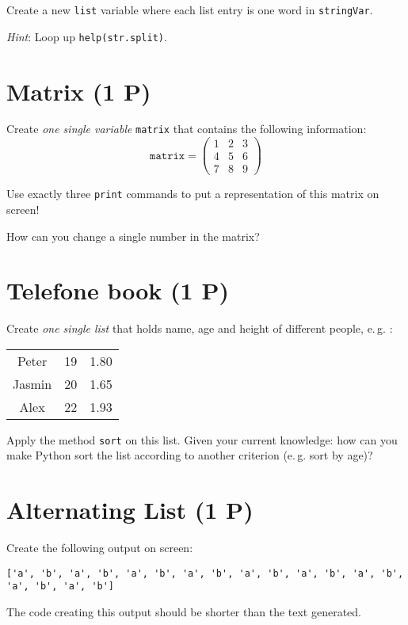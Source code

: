 \documentclass[
	ngerman,
	fontsize=10pt,
	parskip=half,
	titlepage=true,
	DIV=12
]{scrartcl}
\newcommand*{\inPy}[1]{\texttt{#1}}
\newcommand*{\eg}{e.\,g. }
\begin{document}
Create a new \inPy{list} variable where each list entry is one word in \texttt{stringVar}.

\emph{Hint}: Loop up \texttt{help(str.split)}.


\section{Matrix (1 P)}
Create \emph{one single variable} \inPy{matrix} that contains the following information:
\begin{equation*}
	\texttt{matrix} = \begin{pmatrix}
		1 & 2 & 3 \\
		4 & 5 & 6 \\
		7 & 8 & 9
	\end{pmatrix}
\end{equation*}

Use exactly three \inPy{print} commands to put a representation of this matrix on screen!

How can you change a single number in the matrix?

\section{Telefone book (1 P)}
Create \emph{one single list} that holds name, age and height of different people, \eg :
\begin{center}
	\begin{tabular}{ccc}
	Peter  & 19 & 1.80 \\
	Jasmin & 20 & 1.65 \\
	Alex   & 22 & 1.93
	\end{tabular}
\end{center}

Apply the method \inPy{sort} on this list. Given your current knowledge: how can you make Python sort the list according to another criterion (\eg sort by age)?

\section{Alternating List (1 P)}
Create the following output on screen:

\begin{verbatim}
['a', 'b', 'a', 'b', 'a', 'b', 'a', 'b', 'a', 'b', 'a', 'b', 'a', 'b', 'a', 'b', 'a', 'b']
\end{verbatim}

The code creating this output should be shorter than the text generated.
\end{document}

